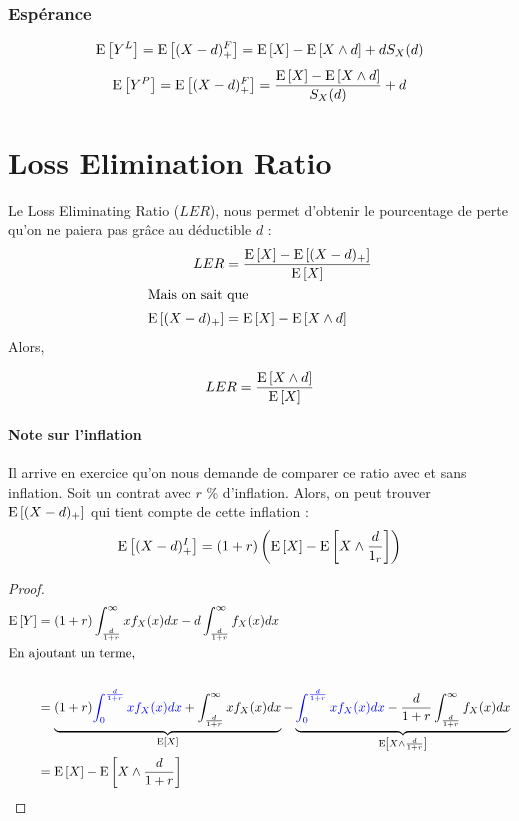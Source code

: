 \documentclass[12pt, french]{report}
\begin{document}
\subsubsection{Espérance}
\begin{equation}
\mathrm{E} \left[ Y^L \right] = \mathrm{E} \left[ (X-d)_+^F \right] = \mathrm{E} \left[ X \right] - \mathrm{E} \left[ X \wedge d \right] + d S_X(d)
\end{equation}
\begin{equation}
\mathrm{E} \left[ Y^P \right] = \mathrm{E} \left[ (X-d)_+^F \right] = \frac{\mathrm{E} \left[ X \right] - \mathrm{E} \left[ X \wedge d \right]}{S_X(d)} + d
\end{equation}

\section{Loss Elimination Ratio}
\begin{definition}
Le Loss Eliminating Ratio ($LER$), nous permet d'obtenir le pourcentage de perte qu'on ne paiera pas grâce au déductible $d$ : 
\begin{align*}
LER 	& = \frac{\mathrm{E} \left[ X \right] - \mathrm{E} \left[ (X-d)_+ \right]}{\mathrm{E} \left[ X \right]} \\
\shortintertext{Mais on sait que}
\mathrm{E} \left[ (X-d)_+ \right]	& = \mathrm{E} \left[ X \right] - \mathrm{E} \left[ X \wedge d \right] \\
\end{align*}
Alors,

\begin{equation}
LER  = \frac{\mathrm{E} \left[ X \wedge d \right]}{\mathrm{E} \left[ X \right]} 
\end{equation}
\end{definition}

\paragraph{Note sur l'inflation} Il arrive en exercice qu'on nous demande de comparer ce ratio avec et sans inflation. Soit un contrat avec $r$ $\%$ d'inflation. Alors, on peut trouver $\mathrm{E} \left[ (X-d)_+ \right]$ qui tient compte de cette inflation : 
\begin{align*}
\mathrm{E} \left[ (X-d)_+^I \right] = (1+r) \left( \mathrm{E} \left[ X \right] - \mathrm{E} \left[ X \wedge \frac{d}{1_r} \right] \right)
\end{align*}

\begin{proof}
\begin{align*}
\mathrm{E} \left[ Y \right]	& = (1+r) \int_{\frac{d}{1+r}}^{\infty} x f_X(x) dx - d \int_{\frac{d}{1+r}}^{\infty} f_X(x) dx \\
	\shortintertext{En ajoutant un terme,} \\
	& = \underbrace{(1+r) \textcolor{blue}{\int_{0}^{\frac{d}{1+r}} x f_X(x) dx} + \int_{\frac{d}{1+r}}^{\infty} x f_X(x) dx}_{\mathrm{E} \left[ X \right]} - \underbrace{\textcolor{blue}{ \int_{0}^{\frac{d}{1+r}} x f_X(x) dx} - \frac{d}{1+r} \int_{\frac{d}{1+r}}^{\infty} f_X(x) dx}_{\mathrm{E} \left[ X \wedge \frac{d}{1+r} \right]} \\ 
	& = \mathrm{E} \left[ X \right] - \mathrm{E} \left[ X \wedge \frac{d}{1+r} \right] \\
\end{align*}
\end{proof}
\end{document}
